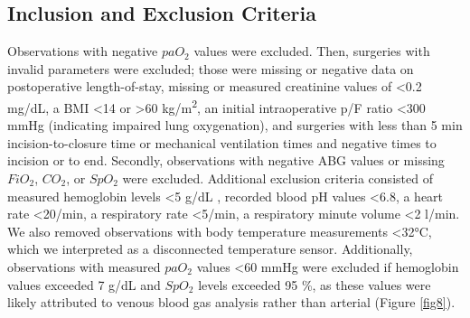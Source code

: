 \documentclass[referee,lineno,pdflatex,sn-nature]{sn-jnl}%
\theoremstyle{thmstyleone}%
\theoremstyle{thmstyletwo}%
\theoremstyle{thmstylethree}%
\begin{document}
\begin{appendices}
\section{Inclusion and Exclusion Criteria}\label{secA3}
Observations with negative $paO_2$ values were excluded. Then, surgeries with invalid parameters were excluded; those were missing or negative data on postoperative length-of-stay, missing or measured creatinine values of \textless0.2 mg/dL, a BMI \textless14 or \textgreater60 kg/m\textsuperscript{2}, an initial intraoperative p/F ratio \textless300 mmHg (indicating impaired lung oxygenation), and surgeries with less than 5 min incision-to-closure time or mechanical ventilation times and negative times to incision or to end. Secondly, observations with negative ABG values or missing $FiO_2$, $CO_2$, or $SpO_2$ were excluded. Additional exclusion criteria consisted of measured hemoglobin levels \textless5 g/dL \cite{ref5,Lundsgaard-Hansen1989}, recorded blood pH values \textless6.8, a heart rate <20/min, a respiratory rate \textless5/min, a respiratory minute volume \textless2 l/min. We also removed observations with body temperature measurements \textless32°C, which we interpreted as a disconnected temperature sensor. Additionally, observations with measured $paO_2$ values \textless60 mmHg were excluded if hemoglobin values exceeded 7 g/dL and $SpO_2$ levels exceeded 95 \%, as these values were likely attributed to venous blood gas analysis rather than arterial (Figure \ref{fig8}).


\end{appendices}
\end{document}
